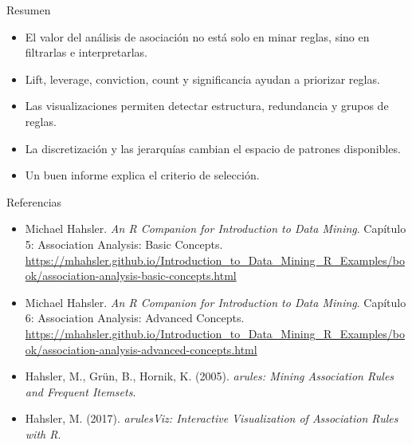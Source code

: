 \documentclass[10pt,aspectratio=169]{beamer}
\begin{document}
\begin{frame}{Resumen}
\begin{itemize}
  \item El valor del análisis de asociación no está solo en minar reglas, sino en filtrarlas e interpretarlas.
  \item Lift, leverage, conviction, count y significancia ayudan a priorizar reglas.
  \item Las visualizaciones permiten detectar estructura, redundancia y grupos de reglas.
  \item La discretización y las jerarquías cambian el espacio de patrones disponibles.
  \item Un buen informe explica el criterio de selección.
\end{itemize}
\end{frame}

\begin{frame}{Referencias }
\footnotesize
\begin{itemize}
  \item Michael Hahsler. \textit{An R Companion for Introduction to Data Mining}. Capítulo 5: Association Analysis: Basic Concepts.\\
  \url{https://mhahsler.github.io/Introduction_to_Data_Mining_R_Examples/book/association-analysis-basic-concepts.html}
  \item Michael Hahsler. \textit{An R Companion for Introduction to Data Mining}. Capítulo 6: Association Analysis: Advanced Concepts.\\
  \url{https://mhahsler.github.io/Introduction_to_Data_Mining_R_Examples/book/association-analysis-advanced-concepts.html}
  \item Hahsler, M., Grün, B., Hornik, K. (2005). \textit{arules: Mining Association Rules and Frequent Itemsets}.
  \item Hahsler, M. (2017). \textit{arulesViz: Interactive Visualization of Association Rules with R}.
\end{itemize}
\end{frame}
\end{document}
